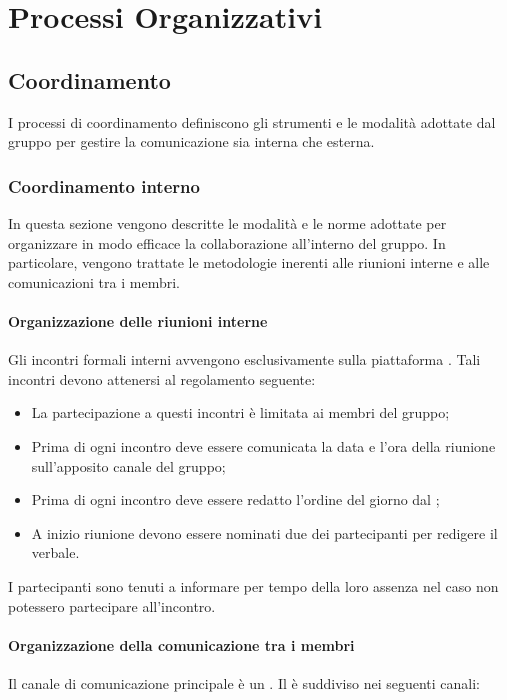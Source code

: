 \section{Processi Organizzativi}
\subsection{Coordinamento}
I processi di coordinamento definiscono gli strumenti e le modalità adottate dal gruppo per gestire la comunicazione sia interna che esterna.
\subsubsection{Coordinamento interno}
In questa sezione vengono descritte le modalità e le norme adottate per organizzare in modo efficace la collaborazione all'interno del gruppo. In particolare, vengono trattate le metodologie inerenti alle riunioni interne e alle comunicazioni tra i membri.
\paragraph*{Organizzazione delle riunioni interne}
Gli incontri formali interni avvengono esclusivamente sulla piattaforma .
Tali incontri devono attenersi al regolamento seguente:
\begin{itemize}
\item La partecipazione a questi incontri è limitata ai membri del gruppo;
\item Prima di ogni incontro deve essere comunicata la data e l'ora della riunione sull'apposito canale  del gruppo;
\item Prima di ogni incontro deve essere redatto l'ordine del giorno dal \RdP{};
\item A inizio riunione devono essere nominati due dei partecipanti per redigere il verbale.
\end{itemize}
I partecipanti sono tenuti a informare per tempo della loro assenza nel caso non potessero partecipare all'incontro.
\paragraph*{Organizzazione della comunicazione tra i membri }
Il canale di comunicazione principale è un  .
Il  è suddiviso nei seguenti canali:

